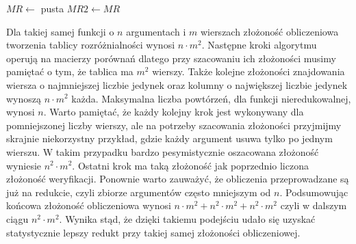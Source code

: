 
\begin{algorithm}[H]
    $MR\gets$ pusta\;
    $MR2\gets MR$\;
\end{algorithm}

Dla takiej samej funkcji o $n$ argumentach i $m$ wierszach złożoność obliczeniowa tworzenia tablicy rozróżnialności wynosi $n \cdot m^2$.
Następne kroki algorytmu operują na macierzy porównań dlatego przy szacowaniu ich złożoności musimy pamiętać o tym,
że tablica ma $m^2$ wierszy.
Także kolejne złożoności znajdowania wiersza o najmniejszej liczbie jedynek oraz kolumny o największej liczbie jedynek wynoszą $n \cdot m^2$ każda.
Maksymalna liczba powtórzeń,
dla funkcji nieredukowalnej,
wynosi $n$.
Warto pamiętać,
że każdy kolejny krok jest wykonywany dla pomniejszonej liczby wierszy,
ale na potrzeby szacowania złożoności przyjmijmy skrajnie niekorzystny przykład,
gdzie każdy argument usuwa tylko po jednym wierszu.
W takim przypadku bardzo pesymistycznie oszacowana złożoność wyniesie $n^2 \cdot m^2$.
Ostatni krok ma taką złożoność jak poprzednio liczona złożoność weryfikacji.
Ponownie warto zauważyć,
że obliczenia przeprowadzane są już na redukcie,
czyli zbiorze argumentów często mniejszym od $n$.
Podsumowując końcowa złożoność obliczeniowa wynosi $n \cdot m^2 + n^2 \cdot m^2 + n^2 \cdot m^2$ czyli w dalszym ciągu $n^2 \cdot m^2$.
Wynika stąd,
że dzięki takiemu podejściu udało się uzyskać statystycznie lepszy redukt przy takiej samej złożoności obliczeniowej.


